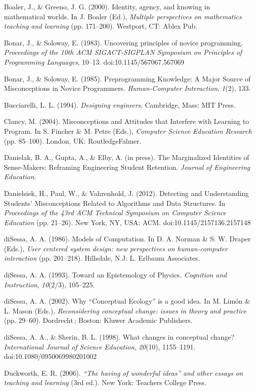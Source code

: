 Boaler, J., \& Greeno, J. G. (2000). Identity, agency, and knowing in
mathematical worlds. In J. Boaler (Ed.), \emph{Multiple perspectives on
mathematics teaching and learning} (pp. 171--200). Westport, CT: Ablex
Pub.

Bonar, J., \& Soloway, E. (1983). Uncovering principles of novice
programming. \emph{Proceedings of the 10th ACM SIGACT-SIGPLAN Symposium
on Principles of Programming Languages}, 10--13.
doi:10.1145/567067.567069

Bonar, J., \& Soloway, E. (1985). Preprogramming Knowledge: A Major
Source of Misconceptions in Novice Programmers. \emph{Human-Computer
Interaction}, \emph{1}(2), 133.

Bucciarelli, L. L. (1994). \emph{Designing engineers}. Cambridge, Mass:
MIT Press.

Clancy, M. (2004). Misconceptions and Attitudes that Interfere with
Learning to Program. In S. Fincher \& M. Petre (Eds.), \emph{Computer
Science Education Research} (pp. 85--100). London, UK: RoutledgeFalmer.

Danielak, B. A., Gupta, A., \& Elby, A. (in press). The Marginalized
Identities of Sense-Makers: Reframing Engineering Student Retention.
\emph{Journal of Engineering Education}.

Danielsiek, H., Paul, W., \& Vahrenhold, J. (2012). Detecting and
Understanding Students' Misconceptions Related to Algorithms and Data
Structures. In \emph{Proceedings of the 43rd ACM Technical Symposium on
Computer Science Education} (pp. 21--26). New York, NY, USA: ACM.
doi:10.1145/2157136.2157148

diSessa, A. A. (1986). Models of Computation. In D. A. Norman \& S. W.
Draper (Eds.), \emph{User centered system design: new perspectives on
human-computer interaction} (pp. 201--218). Hillsdale, N.J: L. Erlbaum
Associates.

diSessa, A. A. (1993). Toward an Epistemology of Physics.
\emph{Cognition and Instruction}, \emph{10}(2/3), 105--225.

diSessa, A. A. (2002). Why ``Conceptual Ecology'' is a good idea. In M.
Limón \& L. Mason (Eds.), \emph{Reconsidering conceptual change: issues
in theory and practice} (pp. 29--60). Dordrecht ; Boston: Kluwer
Academic Publishers.

diSessa, A. A., \& Sherin, B. L. (1998). What changes in conceptual
change? \emph{International Journal of Science Education},
\emph{20}(10), 1155--1191. doi:10.1080/0950069980201002

Duckworth, E. R. (2006). \emph{``The having of wonderful ideas'' and
other essays on teaching and learning} (3rd ed.). New York: Teachers
College Press.

